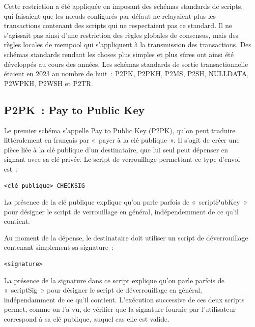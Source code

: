 Cette restriction a été appliquée en imposant des schémas standards de scripts, qui faisaient que les nœuds configurés par défaut ne relayaient plus les transactions contenant des scripts qui ne respectaient pas ce standard. Il ne s'agissait pas ainsi d'une restriction des règles globales de consensus, mais des règles locales de mempool qui s'appliquent à la transmission des transactions. Des schémas standards rendant les choses plus simples et plus sûres ont ainsi été développés au cours des années. Les schémas standards de sortie transactionnelle étaient en 2023 au nombre de huit~: P2PK, P2PKH, P2MS, P2SH, NULLDATA, P2WPKH, P2WSH et P2TR.


\subsection{P2PK~: Pay to Public Key} Le premier schéma s'appelle Pay to Public Key (P2PK), qu'on peut traduire littéralement en français par «~payer à la clé publique~». Il s'agit de créer une pièce liée à la clé publique d'un destinataire, que lui seul peut dépenser en signant avec sa clé privée. Le script de verrouillage permettant ce type d'envoi est~:

\begin{Verbatim}[fontsize=\footnotesize]
<clé publique> CHECKSIG
\end{Verbatim}

La présence de la clé publique explique qu'on parle parfois de «~scriptPubKey~» pour désigner le script de verrouillage en général, indépendemment de ce qu'il contient.

Au moment de la dépense, le destinataire doit utiliser un script de déverrouillage contenant simplement sa signature~:

\begin{Verbatim}[fontsize=\footnotesize]
<signature>
\end{Verbatim}

La présence de la signature dans ce script explique qu'on parle parfois de «~scriptSig~» pour désigner le script de déverrouillage en général, indépendamment de ce qu'il contient. L'exécution successive de ces deux scripts permet, comme on l'a vu, de vérifier que la signature fournie par l'utilisateur correspond à sa clé publique, auquel cas elle est valide.

